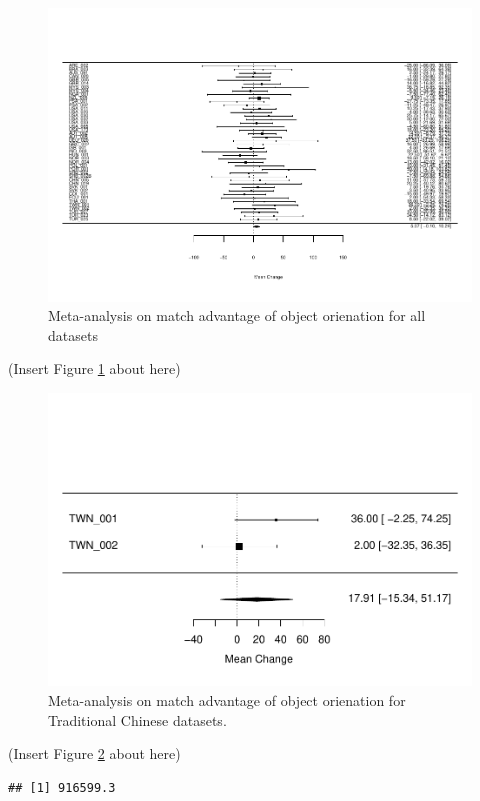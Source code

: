 \documentclass[
  man]{apa6}
\begin{document}
\begin{figure}
\centering
\includegraphics{Stage2_Report_0228_files/figure-latex/meta-all-1.pdf}
\caption{\label{fig:meta-all}Meta-analysis on match advantage of object orienation for all datasets}
\end{figure}

(Insert Figure \ref{fig:meta-all} about here)

\begin{figure}
\centering
\includegraphics{Stage2_Report_0228_files/figure-latex/meta-tc-1.pdf}
\caption{\label{fig:meta-tc}Meta-analysis on match advantage of object orienation for Traditional Chinese datasets.}
\end{figure}

(Insert Figure \ref{fig:meta-tc} about here)

\begin{verbatim}
## [1] 916599.3
\end{verbatim}
\end{document}
